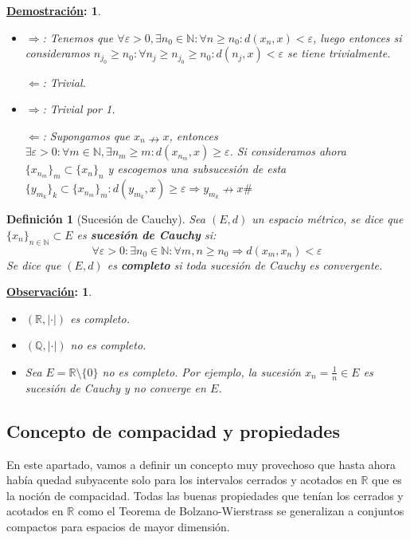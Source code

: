\documentclass[10pt,a4paper,openright]{book}
\theoremstyle{break}
\newtheorem*{defi}{Definición}
\newtheorem*{demo}{\underline{Demostración}:}
\newtheorem*{obs}{\underline{Observación}:}
\begin{document}
\begin{demo}
\begin{itemize}
\item $\Rightarrow$: Tenemos que $\forall \varepsilon > 0, \exists n_0 \in \mathbb{N} : \forall n \geq n_0 : d(x_n,x) < \varepsilon$, luego entonces si consideramos $n_{j_0} \geq n_0 : \forall n_j \geq n_{j_0} \geq n_0 : d(n_{j}, x) < \varepsilon$ se tiene trivialmente.

$\Leftarrow$: Trivial.

\item  $\Rightarrow$: Trivial por 1.

$\Leftarrow$: Supongamos que $x_n  \nrightarrow x$, entonces $\exists \varepsilon > 0 : \forall m \in \mathbb{N}, \exists n_m \geq m : d(x_{n_m}, x) \geq \varepsilon$. Si consideramos ahora $\{x_{n_m}\}_m \subset \{x_n\}_n$ y escogemos una subsucesión de esta $\{y_{m_k}\}_k \subset \{x_{n_m}\}_m : d(y_{m_k}, x) \geq \varepsilon\Rightarrow y_{m_k} \nrightarrow x \#$
\end{itemize}
\end{demo}

\begin{defi}[Sucesión de Cauchy]
Sea $(E,d)$ un espacio métrico, se dice que $\{x_n\}_{n\in \mathbb{N}} \subset E$ es \textbf{sucesión de Cauchy} si:
$$\forall \varepsilon > 0: \exists n_0 \in \mathbb{N} : \forall m,n \geq n_0 \Rightarrow d(x_m, x_n) < \varepsilon$$
Se dice que $(E,d)$ es \textbf{completo} si toda sucesión de Cauchy es convergente.
\end{defi}

\newpage

\begin{obs}
\begin{itemize}
\item $(\mathbb{R}, |\cdot|)$ es completo.

\item $(\mathbb{Q}, |\cdot|)$ no es completo.

\item Sea $E = \mathbb{R} \setminus \{0\}$ no es completo. Por ejemplo, la sucesión $x_n = \frac{1}{n} \in E$ es sucesión de Cauchy y no converge en $E$.
\end{itemize}
\end{obs}

\subsection{Concepto de compacidad y propiedades}
En este apartado, vamos a definir un concepto muy provechoso que hasta ahora había quedad subyacente solo para los intervalos cerrados y acotados en $\mathbb{R}$ que es la noción de compacidad. Todas las buenas propiedades que tenían los cerrados y acotados en $\mathbb{R}$ como el Teorema de Bolzano-Wierstrass se generalizan a conjuntos compactos para espacios de mayor dimensión.
\end{document}
